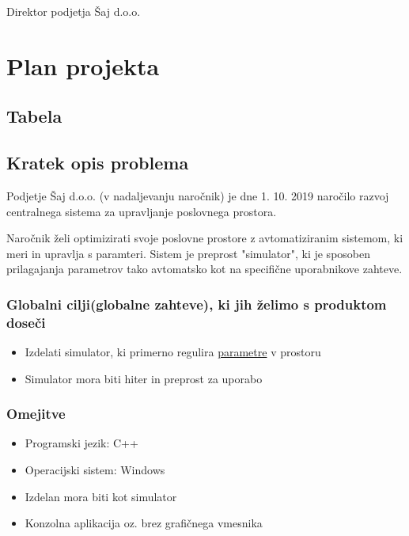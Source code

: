 \documentclass[a4paper,12pt]{article}
\begin{document}

	\hfill Direktor podjetja Šaj d.o.o.	

\newpage

\section{Plan projekta}

	\subsection{Tabela}

	\subsection{Kratek opis problema}

		\hspace{1em} Podjetje Šaj d.o.o. (v nadaljevanju naročnik) je dne 1. 10. 2019 naročilo 
		razvoj centralnega sistema za upravljanje poslovnega prostora.
		
		Naročnik želi optimizirati svoje poslovne prostore z avtomatiziranim sistemom, 
		ki meri in upravlja s paramteri. Sistem je preprost "simulator", ki je sposoben 
		prilagajanja parametrov tako avtomatsko kot na specifične uporabnikove zahteve.
		\subsubsection{Globalni cilji(globalne zahteve), ki jih želimo s produktom doseči}

		\begin{itemize}
				\item Izdelati simulator, ki primerno regulira \textcolor{red!80!}{\hyperlink{subsection.1.8}{parametre}} v prostoru
			\item Simulator mora biti hiter in preprost za uporabo
		\end{itemize}

		\subsubsection{Omejitve}

				\begin{itemize}
					\item Programski jezik: C++
					\item Operacijski sistem: Windows
					\item Izdelan mora biti kot simulator
					\item Konzolna aplikacija oz. brez grafičnega vmesnika
				\end{itemize}
\end{document}
